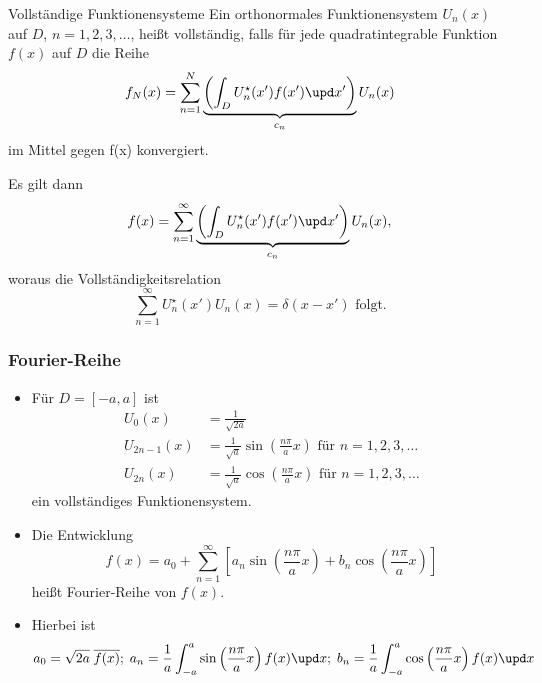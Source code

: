       \begin{frame}
        \begin{block}{Vollständige Funktionensysteme}
          Ein orthonormales Funktionensystem $U_n(x)$ auf $D$, $n= 1, 2, 3,\dots$, heißt \alert{vollständig}, falls für \alert{jede quadratintegrable Funktion} $f(x)$ auf $D$ die Reihe
          $$
          f_N(x) = \sum_{n=1}^N \underbrace{\left(\int_D U_n^\star(x') f(x') \upd x'\right)}_{c_n} U_n(x)
          $$
          \alert{im Mittel} gegen f(x) konvergiert.\pause

          Es gilt dann
          $$
          f(x) = \sum_{n=1}^\infty \underbrace{\left(\int_D U_n^\star(x') f(x') \upd x'\right)}_{c_n} U_n(x),
          $$\pause
          woraus die \alert{Vollständigkeitsrelation}
          $$
          \sum_{n=1}^\infty U_n^\star(x') U_n(x) = \delta(x-x') \text{ folgt.}
          $$
    \end{block}
        
  \end{frame}
        \begin{frame}
          \frametitle{Fourier-Reihe}
          \begin{itemize}[<+->]
          \item Für $D = [-a, a]$ ist
            \begin{align*}
            U_0(x) & = \frac{1}{\sqrt{2a}} \\ 
            U_{2n-1}(x) & =  \frac{1}{\sqrt{a}}\sin\left(\frac{n\pi}{a}x\right) \text{ für } n=1,2,3,\dots\\ 
            U_{2n}(x) &=  \frac{1}{\sqrt{a}}\cos\left(\frac{n\pi}{a}x\right) \text{ für } n=1,2,3,\dots 
              \end{align*}
              ein vollständiges Funktionensystem.
            \item Die Entwicklung
              $$
              f(x) = a_0 + \sum_{n=1}^\infty \left[  a_n \sin\left(\frac{n\pi}{a}x\right) + b_n \cos\left(\frac{n\pi}{a}x\right)\right]
              $$ heißt \alert{Fourier-Reihe} von $f(x)$.
            \item Hierbei ist
              $$
              a_0 = \sqrt{2a}\; \overline{f(x)};\; a_n = \frac{1}{a} \int_{-a}^a \sin\left(\frac{n\pi}{a}x\right) f(x) \upd x ;\; b_n = \frac{1}{a} \int_{-a}^a \cos\left(\frac{n\pi}{a}x\right) f(x) \upd x
              $$
            \end{itemize}
          \end{frame}
          
